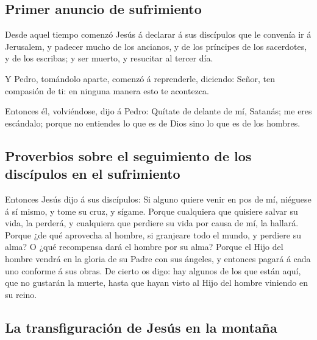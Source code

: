 \hypertarget{primer-anuncio-de-sufrimiento}{%
\subsection{Primer anuncio de
sufrimiento}\label{primer-anuncio-de-sufrimiento}}

 Desde aquel tiempo comenzó Jesús á declarar á sus
discípulos que le convenía ir á Jerusalem, y padecer mucho de los
ancianos, y de los príncipes de los sacerdotes, y de los escribas; y ser
muerto, y resucitar al tercer día.

 Y Pedro, tomándolo aparte, comenzó á reprenderle,
diciendo: Señor, ten compasión de ti: en ninguna manera esto te
acontezca.

 Entonces él, volviéndose, dijo á Pedro: Quítate de
delante de mí, Satanás; me eres escándalo; porque no entiendes lo que es
de Dios sino lo que es de los hombres.

\hypertarget{proverbios-sobre-el-seguimiento-de-los-discuxedpulos-en-el-sufrimiento}{%
\subsection{Proverbios sobre el seguimiento de los discípulos en el
sufrimiento}\label{proverbios-sobre-el-seguimiento-de-los-discuxedpulos-en-el-sufrimiento}}

 Entonces Jesús dijo á sus discípulos: Si alguno quiere
venir en pos de mí, niéguese á sí mismo, y tome su cruz, y sígame.
 Porque cualquiera que quisiere salvar su vida, la
perderá, y cualquiera que perdiere su vida por causa de mí, la hallará.
 Porque ¿de qué aprovecha al hombre, si granjeare todo el
mundo, y perdiere su alma? O ¿qué recompensa dará el hombre por su alma?
 Porque el Hijo del hombre vendrá en la gloria de su
Padre con sus ángeles, y entonces pagará á cada uno conforme á sus
obras.  De cierto os digo: hay algunos de los que están
aquí, que no gustarán la muerte, hasta que hayan visto al Hijo del
hombre viniendo en su reino.

\hypertarget{la-transfiguraciuxf3n-de-jesuxfas-en-la-montauxf1a}{%
\subsection{La transfiguración de Jesús en la
montaña}\label{la-transfiguraciuxf3n-de-jesuxfas-en-la-montauxf1a}}

